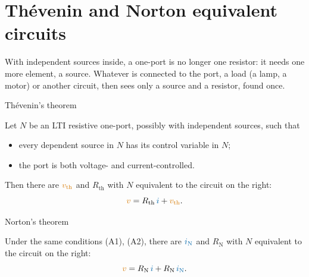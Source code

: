 \documentclass[11pt,a4paper]{article}
\newcommand{\Icol}[1]{\textcolor{ccur}{#1}}
\newcommand{\Vcol}[1]{\textcolor{cvolt}{#1}}
\newcommand{\oneport}[2][1.9]{%
  \draw[elem] (0,0) rectangle (#1,2);
  \node[align=center, font=\small] at ({#1/2},1) {#2};
  \begin{scope}[shift={(#1-1.9,0)}]
  \draw (1.9,1.7) -- (3.0,1.7) node[ocirc] {} node[right, tlab] {a};
  \draw (1.9,0.3) -- (3.0,0.3) node[ocirc] {} node[right, tlab] {b};
  \draw[iar] (2.75,1.95) -- (2.2,1.95); \node[font=\small, text=ccur] at (2.48,2.2) {$i$};
  \node[pol] at (2.6,1.4) {$+$}; \node[pol] at (2.6,0.6) {$-$};
  \node[font=\small, text=cvolt] at (2.6,1.0) {$v$};
  \end{scope}}
\newcommand{\Rth}{R_{\mathrm{th}}}
\newcommand{\RN}{R_{\mathrm{N}}}
\newcommand{\vth}{\Vcol{v_{\mathrm{th}}}}
\newcommand{\iN}{\Icol{i_{\mathrm{N}}}}
\newcommand{\thev}[2]{%
  \draw (0,1.7) to[american voltage source, l_=#1] (0,0.3);
  \draw (0,1.7) to[R, l=#2] (2.4,1.7);
  \draw (0,0.3) -- (2.4,0.3);
  \draw (2.4,1.7) node[ocirc] {} node[right, tlab] {a};
  \draw (2.4,0.3) node[ocirc] {} node[right, tlab] {b};}
\newcommand{\nort}[2]{%
  \draw (0,0.3) to[american current source, l=#1] (0,1.7) -- (2.6,1.7);
  \draw (1.4,1.7) to[R, l=#2] (1.4,0.3);
  \draw (0,0.3) -- (2.6,0.3);
  \fill (1.4,1.7) circle (1.6pt); \fill (1.4,0.3) circle (1.6pt);
  \draw (2.6,1.7) node[ocirc] {} node[right, tlab] {a};
  \draw (2.6,0.3) node[ocirc] {} node[right, tlab] {b};}
\newcommand{\portiv}[1]{%
  \draw[iar] (#1+0.05,1.95) -- (#1-0.5,1.95); \node[font=\small, text=ccur] at (#1-0.22,2.22) {$i$};
  \node[pol] at (#1+0.05,1.35) {$+$}; \node[pol] at (#1+0.05,0.65) {$-$};
  \node[font=\small, text=cvolt] at (#1+0.05,1.0) {$v$};}
\begin{document}
\section{Th\'evenin and Norton equivalent circuits}

With independent sources inside, a one-port is no longer one resistor: it needs one more
element, a source. Whatever is connected to the port, a load (a lamp, a motor) or another circuit,
then sees only a source and a resistor, found once.

\begin{definitionbox}{Th\'evenin's theorem}
\begin{minipage}[c]{0.44\linewidth}
Let $N$ be an LTI resistive one-port, possibly with independent sources, such that
\begin{itemize}[leftmargin=2.4em, itemsep=1pt]
  \item[(A1)] every dependent source in $N$ has its control variable in $N$;
  \item[(A2)] the port is both voltage- and current-controlled.
\end{itemize}
Then there are $\vth$ and $\Rth$ with $N$ equivalent to the circuit on the right:
\[
  \Vcol{v} = \Rth\,\Icol{i} + \vth .
\]
\end{minipage}\hfill
\begin{minipage}[c]{0.54\linewidth}
\centering
{}
\end{minipage}
\end{definitionbox}

\begin{definitionbox}{Norton's theorem}
\begin{minipage}[c]{0.44\linewidth}
Under the same conditions (A1), (A2), there are $\iN$ and $\RN$ with $N$ equivalent to the
circuit on the right:
\[
  \Vcol{v} = \RN\,\Icol{i} + \RN\,\iN .
\]
\end{minipage}\hfill
\begin{minipage}[c]{0.54\linewidth}
\centering
{}
\end{minipage}
\end{definitionbox}
\end{document}
